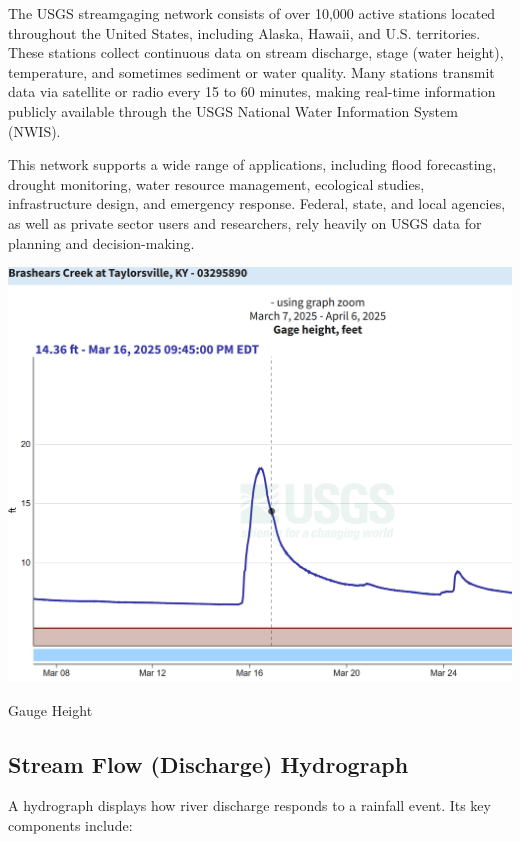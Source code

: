 \documentclass{tufte-handout}\usepackage[]{graphicx}\usepackage[]{xcolor}
\begin{document}
The USGS streamgaging network consists of over 10,000 active stations located throughout the United States, including Alaska, Hawaii, and U.S. territories. These stations collect continuous data on stream discharge, stage (water height), temperature, and sometimes sediment or water quality. Many stations transmit data via satellite or radio every 15 to 60 minutes, making real-time information publicly available through the USGS National Water Information System (NWIS).

This network supports a wide range of applications, including flood forecasting, drought monitoring, water resource management, ecological studies, infrastructure design, and emergency response. Federal, state, and local agencies, as well as private sector users and researchers, rely heavily on USGS data for planning and decision-making.

\begin{marginfigure}
	\centering
		\includegraphics[width=1.00\textwidth]{figure/Gauge_height.png}
		\caption{Gauge Height}
	\label{fig:gauge_ht}
\end{marginfigure}

\subsection{Stream Flow (Discharge) Hydrograph}

A hydrograph displays how river discharge responds to a rainfall event. Its key components include:
\end{document}
